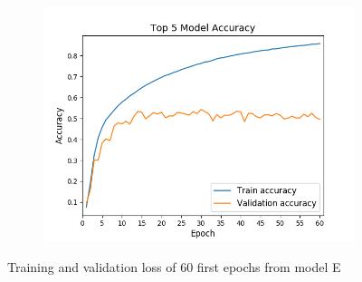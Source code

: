 \begin{figure}[!h]
\begin{subfigure}[b]{0.32\textwidth}
            \centering
            \includegraphics[width=\textwidth]{images/final_top5.png}
            \caption[]%
            {{\small }}
        \end{subfigure}
        \caption[]
        {\small Training and validation loss of 60 first epochs from model E}
    \end{figure}
